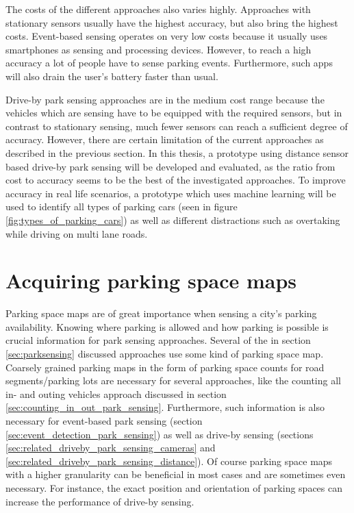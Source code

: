 The costs of the different approaches also varies highly. Approaches with stationary sensors usually have the highest accuracy, but also bring the highest costs. Event-based sensing operates on very low costs because it usually uses smartphones as sensing and processing devices. However, to reach a high accuracy a lot of people have to sense parking events. Furthermore, such apps will also drain the user's battery faster than usual. 

Drive-by park sensing approaches are in the medium cost range because the vehicles which are sensing have to be equipped with the required sensors, but in contrast to stationary sensing, much fewer sensors can reach a sufficient degree of accuracy. However, there are certain limitation of the current approaches as described in the previous section. In this thesis, a prototype using distance sensor based drive-by park sensing will be developed and evaluated, as the ratio from cost to accuracy seems to be the best of the investigated approaches. To improve accuracy in real life scenarios, a prototype which uses machine learning will be used to identify all types of parking cars (seen in figure \ref{fig:types_of_parking_cars}) as well as different distractions such as overtaking while driving on multi lane roads.







\section{Acquiring parking space maps}
\label{sec:acquiring_parking_space_maps}

Parking space maps are of great importance when sensing a city's parking availability. Knowing where parking is allowed and how parking is possible is crucial information for park sensing approaches. Several of the in section \ref{sec:parksensing} discussed approaches use some kind of parking space map. Coarsely grained parking maps in the form of parking space counts for road segments/parking lots are necessary for several approaches, like the counting all in- and outing vehicles approach discussed in section \ref{sec:counting_in_out_park_sensing}. Furthermore, such information is also necessary for event-based park sensing (section \ref{sec:event_detection_park_sensing}) as well as drive-by sensing (sections \ref{sec:related_driveby_park_sensing_cameras} and \ref{sec:related_driveby_park_sensing_distance}). Of course parking space maps with a higher granularity can be beneficial in most cases and are sometimes even necessary. For instance, the exact position and orientation of parking spaces can increase the performance of drive-by sensing.

